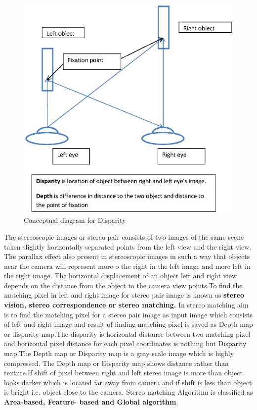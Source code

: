 \begin{figure}[h]
\begin{center}
\includegraphics[width=4.5in]{dis.eps}
\caption{Conceptual diagram for Disparity}\label{lined}
\end{center}
\end{figure}
The stereoscopic images or stereo pair consists of two images of the same scene taken slightly horizontally separated points from the left view and the right view. The parallax effect also present in stereoscopic images in such a way that objects near the camera will represent more o the right in the left image and more left in the right image.
The horizontal displacement of an object left and right view depends on the distance from the object to the camera view points.\newline To find the matching pixel in left and right image for stereo pair image is known as \textbf{stereo vision, stereo correspondence or stereo matching.}
In stereo matching aim is to find the matching pixel for a stereo pair image as input image which consists of left and right image and result of finding matching pixel is saved as Depth map or disparity map.The disparity is horizontal distance between two matching pixel and horizontal pixel distance for each pixel coordinates is nothing but Disparity map.\newline The Depth map or Disparity map is a gray scale image which is highly compressed. The Depth map or Disparity map shows distance rather than texture.If shift of pixel between  right and left stereo image is more than object looks darker which is located far away from camera and if shift is less than object is bright i.e. object close to the camera.\newline
Stereo matching Algorithm is classified as \textbf{Area-based, Feature- based and Global algorithm}.
 
